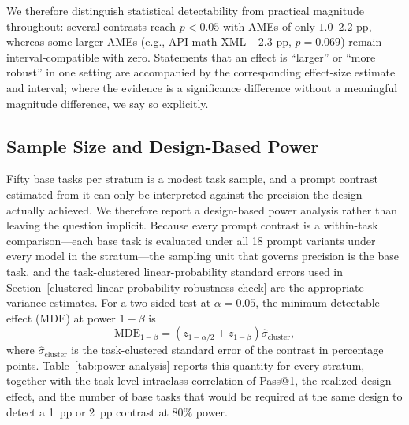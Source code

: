 \documentclass[a4paper,fleqn]{cas-sc}
\begin{document}
We therefore distinguish statistical detectability from practical magnitude throughout: several contrasts reach $p < 0.05$ with AMEs of only $1.0$--$2.2$ pp, whereas some larger AMEs (e.g., API math XML $-2.3$ pp, $p = 0.069$) remain interval-compatible with zero. Statements that an effect is ``larger'' or ``more robust'' in one setting are accompanied by the corresponding effect-size estimate and interval; where the evidence is a significance difference without a meaningful magnitude difference, we say so explicitly.

\subsection{Sample Size and Design-Based Power}\label{sample-size-and-power}

Fifty base tasks per stratum is a modest task sample, and a prompt contrast estimated from it can only be interpreted against the precision the design actually achieved. We therefore report a design-based power analysis rather than leaving the question implicit. Because every prompt contrast is a within-task comparison---each base task is evaluated under all 18 prompt variants under every model in the stratum---the sampling unit that governs precision is the base task, and the task-clustered linear-probability standard errors used in Section~\ref{clustered-linear-probability-robustness-check} are the appropriate variance estimates. For a two-sided test at $\alpha = 0.05$, the minimum detectable effect (MDE) at power $1 - \beta$ is
\begin{equation}
\mathrm{MDE}_{1-\beta} = \left(z_{1-\alpha/2} + z_{1-\beta}\right)\hat{\sigma}_{\text{cluster}},
\label{eq:mde}
\end{equation}
where $\hat{\sigma}_{\text{cluster}}$ is the task-clustered standard error of the contrast in percentage points. Table~\ref{tab:power-analysis} reports this quantity for every stratum, together with the task-level intraclass correlation of Pass@1, the realized design effect, and the number of base tasks that would be required at the same design to detect a 1~pp or 2~pp contrast at $80\%$ power.
\end{document}
